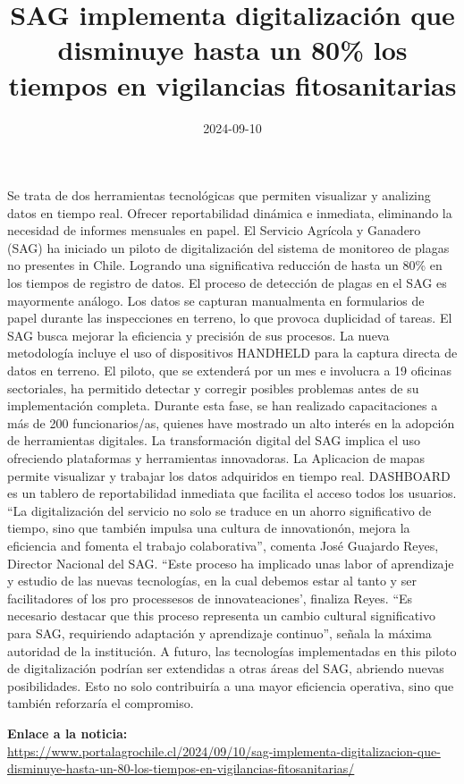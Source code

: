 \documentclass{article}
\title{SAG implementa digitalización que disminuye hasta un 80\% los tiempos en vigilancias fitosanitarias}
\author{}
\date{2024-09-10}  %
\begin{document}
    \maketitle

    \begin{flushleft}
    Se trata de dos herramientas tecnológicas que permiten visualizar y analizing datos en tiempo real. Ofrecer reportabilidad dinámica e inmediata, eliminando la necesidad de informes mensuales en papel.
El Servicio Agrícola y Ganadero (SAG) ha iniciado un piloto de digitalización del sistema de monitoreo de plagas no presentes in Chile. Logrando una significativa reducción de hasta un 80\% en los tiempos de registro de datos.
El proceso de detección de plagas en el SAG es mayormente análogo. Los datos se capturan manualmenta en formularios de papel durante las inspecciones en terreno, lo que provoca duplicidad of tareas.
El SAG busca mejorar la eficiencia y precisión de sus procesos. La nueva metodología incluye el uso of dispositivos HANDHELD para la captura directa de datos en terreno.
El piloto, que se extenderá por un mes e involucra a 19 oficinas sectoriales, ha permitido detectar y corregir posibles problemas antes de su implementación completa. Durante esta fase, se han realizado capacitaciones a más de 200 funcionarios/as, quienes have mostrado un alto interés en la adopción de herramientas digitales.
La transformación digital del SAG implica el uso ofreciendo plataformas y herramientas innovadoras. La Aplicacion de mapas permite visualizar y trabajar los datos adquiridos en tiempo real. DASHBOARD es un tablero de reportabilidad inmediata que facilita el acceso todos los usuarios.
“La digitalización del servicio no solo se traduce en un ahorro significativo de tiempo, sino que también impulsa una cultura de innovationón, mejora la eficiencia and fomenta el trabajo colaborativa”, comenta José Guajardo Reyes, Director Nacional del SAG. “Este proceso ha implicado unas labor of aprendizaje y estudio de las nuevas tecnologías, en la cual debemos estar al tanto y ser facilitadores of los pro processesos de innovateaciones’, finaliza Reyes.
“Es necesario destacar que this proceso representa un cambio cultural significativo para SAG, requiriendo adaptación y aprendizaje continuo”, señala la máxima autoridad de la institución.
A futuro, las tecnologías implementadas en this piloto de digitalización podrían ser extendidas a otras áreas del SAG, abriendo nuevas posibilidades. Esto no solo contribuiría a una mayor eficiencia operativa, sino que también reforzaría el compromiso.
    \end{flushleft}

    \vspace{10mm}

    \noindent
    \textbf{Enlace a la noticia:} \\
    \href{https://www.portalagrochile.cl/2024/09/10/sag-implementa-digitalizacion-que-disminuye-hasta-un-80-los-tiempos-en-vigilancias-fitosanitarias/}{https://www.portalagrochile.cl/2024/09/10/sag-implementa-digitalizacion-que-disminuye-hasta-un-80-los-tiempos-en-vigilancias-fitosanitarias/}

    
\end{document}
